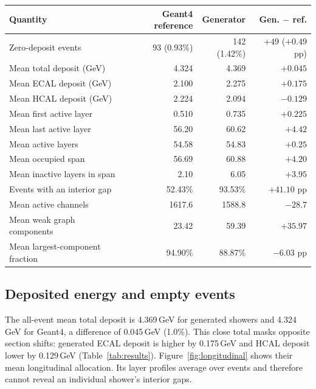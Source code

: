 \documentclass[11pt]{article}
\begin{document}
\begin{center}
\begin{minipage}{\linewidth}
\centering
{}
\label{tab:results}
\small
\begin{tabular}{@{}lrrr@{}}
\toprule
Quantity & Geant4 reference & Generator & Gen. $-$ ref. \\
\midrule
Zero-deposit events & 93 (0.93\%) & 142 (1.42\%) & $+49$ ($+0.49$ pp) \\
Mean total deposit (GeV) & 4.324 & 4.369 & $+0.045$ \\
Mean ECAL deposit (GeV) & 2.100 & 2.275 & $+0.175$ \\
Mean HCAL deposit (GeV) & 2.224 & 2.094 & $-0.129$ \\
\midrule
Mean first active layer & 0.510 & 0.735 & $+0.225$ \\
Mean last active layer & 56.20 & 60.62 & $+4.42$ \\
Mean active layers & 54.58 & 54.83 & $+0.25$ \\
Mean occupied span & 56.69 & 60.88 & $+4.20$ \\
Mean inactive layers in span & 2.10 & 6.05 & $+3.95$ \\
Events with an interior gap & 52.43\% & 93.53\% & $+41.10$ pp \\
Mean active channels & 1617.6 & 1588.8 & $-28.7$ \\
Mean weak graph components & 23.42 & 59.39 & $+35.97$ \\
Mean largest-component fraction & 94.90\% & 88.87\% & $-6.03$ pp \\
\bottomrule
\end{tabular}
\end{minipage}
\end{center}

\subsection{Deposited energy and empty events}

The all-event mean total deposit is 4.369\,GeV for generated showers and 4.324\,GeV for Geant4, a difference of 0.045\,GeV (1.0\%). This close total masks opposite section shifts: generated ECAL deposit is higher by 0.175\,GeV and HCAL deposit lower by 0.129\,GeV (Table~\ref{tab:results}). Figure~\ref{fig:longitudinal} shows their mean longitudinal allocation. Its layer profiles average over events and therefore cannot reveal an individual shower's interior gaps.
\end{document}
